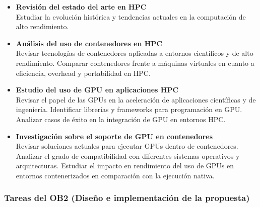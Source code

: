 \begin{itemize}
      \item \textbf{Revisión del estado del arte en HPC} \\
            Estudiar la evolución histórica y tendencias actuales en la computación de alto rendimiento.

      \item \textbf{Análisis del uso de contenedores en HPC} \\
            Revisar tecnologías de contenedores aplicadas a entornos científicos y de alto rendimiento. Comparar contenedores frente a máquinas virtuales en cuanto a eficiencia, overhead y portabilidad en HPC.

      \item \textbf{Estudio del uso de GPU en aplicaciones HPC} \\
            Revisar el papel de las GPUs en la aceleración de aplicaciones científicas y de ingeniería. Identificar librerías y frameworks para programación en GPU. Analizar casos de éxito en la integración de GPU en entornos HPC.

      \item \textbf{Investigación sobre el soporte de GPU en contenedores} \\
            Revisar soluciones actuales para ejecutar GPUs dentro de contenedores. Analizar el grado de compatibilidad con diferentes sistemas operativos y arquitecturas. Estudiar el impacto en rendimiento del uso de GPUs en entornos contenerizados en comparación con la ejecución nativa.
\end{itemize}

\subsubsection{Tareas del OB2 (Diseño e implementación de la propuesta)}\label{subsubsec:tareas_ob2}

